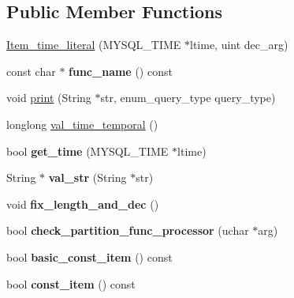 \subsection*{Public Member Functions}
\begin{DoxyCompactItemize}
\item 
\mbox{\hyperlink{classItem__time__literal_a81956a462df92831b4526d2af2f80fb1}{Item\+\_\+time\+\_\+literal}} (M\+Y\+S\+Q\+L\+\_\+\+T\+I\+ME $\ast$ltime, uint dec\+\_\+arg)
\item 
\mbox{\label{classItem__time__literal_ab5a557a5460d7408b4bf5da33d106f01}} 
const char $\ast$ {\bfseries func\+\_\+name} () const
\item 
void \mbox{\hyperlink{classItem__time__literal_a4e8dca3ff39e2a0ecd40373f083f9b14}{print}} (String $\ast$str, enum\+\_\+query\+\_\+type query\+\_\+type)
\item 
longlong \mbox{\hyperlink{classItem__time__literal_a38682be97c3300d176410c59ca436c1b}{val\+\_\+time\+\_\+temporal}} ()
\item 
\mbox{\label{classItem__time__literal_ac87d7c2eeb3318076963dd625e527307}} 
bool {\bfseries get\+\_\+time} (M\+Y\+S\+Q\+L\+\_\+\+T\+I\+ME $\ast$ltime)
\item 
\mbox{\label{classItem__time__literal_a22c9cc2a0a216c84a1a6152ae2d9eb89}} 
String $\ast$ {\bfseries val\+\_\+str} (String $\ast$str)
\item 
\mbox{\label{classItem__time__literal_a0e5c30cbb3027376dda90816ab7dcdf5}} 
void {\bfseries fix\+\_\+length\+\_\+and\+\_\+dec} ()
\item 
\mbox{\label{classItem__time__literal_a9d4dfbc8b14ca7f0e753955262e44ca5}} 
bool {\bfseries check\+\_\+partition\+\_\+func\+\_\+processor} (uchar $\ast$arg)
\item 
\mbox{\label{classItem__time__literal_a12cbb05f86fdbee71e0c7e266d2bc3a6}} 
bool {\bfseries basic\+\_\+const\+\_\+item} () const
\item 
\mbox{\label{classItem__time__literal_a81f24947cad897d8c600fa7a94b1c801}} 
bool {\bfseries const\+\_\+item} () const

\end{DoxyCompactItemize}
